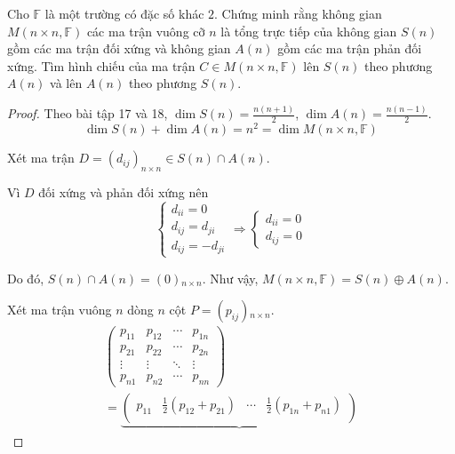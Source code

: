 \documentclass[class=linearalgebra,crop=false]{standalone}
\begin{document}
\begin{exercise}
    Cho $\mathbb{F}$ là một trường có đặc số khác $2$. Chứng minh rằng không gian $M(n\times n, \mathbb{F})$ các ma trận vuông cỡ $n$ là tổng trực tiếp của không gian $S(n)$ gồm các ma trận đối xứng và không gian $A(n)$ gồm các ma trận phản đối xứng. Tìm hình chiếu của ma trận $C\in M(n\times n, \mathbb{F})$ lên $S(n)$ theo phương $A(n)$ và lên $A(n)$ theo phương $S(n)$.
\end{exercise}

\begin{proof}
    Theo bài tập 17 và 18, $\dim S(n) = \frac{n(n+1)}{2}$, $\dim A(n) = \frac{n(n-1)}{2}$.
        \[ \dim S(n) + \dim A(n) = n^{2} = \dim M(n\times n,\mathbb{F}) \]
    \par Xét ma trận $D = (d_{ij})_{n\times n} \in S(n)\cap A(n)$.
    \par Vì $D$ đối xứng và phản đối xứng nên
        \[
            \begin{cases}
                d_{ii} = 0 \\
                d_{ij} = d_{ji} \\
                d_{ij} = - d_{ji}
            \end{cases}
            \Longrightarrow
            \begin{cases}
                d_{ii} = 0 \\
                d_{ij} = 0
            \end{cases}
        \]
    \par Do đó, $S(n) \cap A(n) = (0){}_{n\times n}$. Như vậy, $M(n\times n,\mathbb{F}) = S(n)\oplus A(n)$.
    \par Xét ma trận vuông $n$ dòng $n$ cột $P = (p_{ij}){}_{n\times n}$.
        \begin{gather*}
            \begin{pmatrix}
                p_{11} & p_{12} & \cdots & p_{1n} \\
                p_{21} & p_{22} & \cdots & p_{2n} \\
                \vdots & \vdots & \ddots & \vdots \\
                p_{n1} & p_{n2} & \cdots & p_{nn}
            \end{pmatrix} \\
            =
            \underbrace{
                \begin{pmatrix}
                    p_{11} & \frac{1}{2}(p_{12} + p_{21}) & \cdots & \frac{1}{2}(p_{1n} + p_{n1}) \\

\end{pmatrix}}
\end{gather*}
\end{proof}
\end{document}
